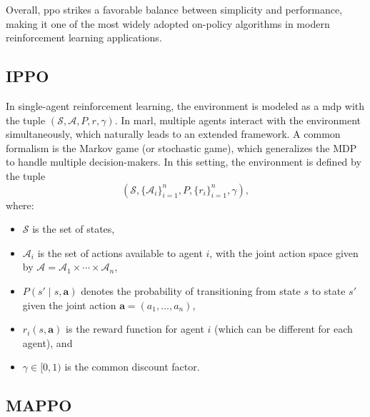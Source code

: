 Overall, \gls{ppo} strikes a favorable balance between simplicity and performance, making it one of the most widely adopted on-policy algorithms in modern reinforcement learning applications.
\subsection{IPPO}
In single-agent reinforcement learning, the environment is modeled as a \gls{mdp} with the tuple \((\mathcal{S}, \mathcal{A}, P, r, \gamma)\). In \gls{marl}, multiple agents interact with the environment simultaneously, which naturally leads to an extended framework. A common formalism is the Markov game (or stochastic game), which generalizes the MDP to handle multiple decision-makers. In this setting, the environment is defined by the tuple
\[
(\mathcal{S}, \{\mathcal{A}_i\}_{i=1}^n, P, \{r_i\}_{i=1}^n, \gamma),
\]
where:
\begin{itemize}
    \item \(\mathcal{S}\) is the set of states,
    \item \(\mathcal{A}_i\) is the set of actions available to agent \(i\), with the joint action space given by \(\mathcal{A} = \mathcal{A}_1 \times \cdots \times \mathcal{A}_n\),
    \item \(P(s' \mid s, \mathbf{a})\) denotes the probability of transitioning from state \(s\) to state \(s'\) given the joint action \(\mathbf{a} = (a_1, \dots, a_n)\),
    \item \(r_i(s, \mathbf{a})\) is the reward function for agent \(i\) (which can be different for each agent), and
    \item \(\gamma \in [0,1)\) is the common discount factor.
\end{itemize}


\subsection{MAPPO}

